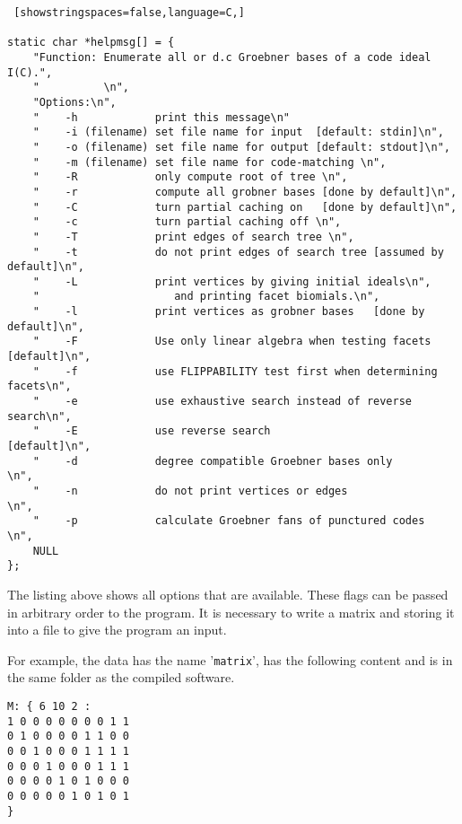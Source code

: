 \begin{lstlisting} [showstringspaces=false,language=C,]

static char *helpmsg[] = {
    "Function: Enumerate all or d.c Groebner bases of a code ideal I(C).",
    "          \n",
    "Options:\n",
    "    -h            print this message\n"
    "    -i (filename) set file name for input  [default: stdin]\n",
    "    -o (filename) set file name for output [default: stdout]\n",
    "    -m (filename) set file name for code-matching \n",
    "    -R            only compute root of tree \n",
    "    -r            compute all grobner bases [done by default]\n",
    "    -C            turn partial caching on   [done by default]\n",
    "    -c            turn partial caching off \n",
    "    -T            print edges of search tree \n",
    "    -t            do not print edges of search tree [assumed by default]\n",  
    "    -L            print vertices by giving initial ideals\n",
    "                     and printing facet biomials.\n",
    "    -l            print vertices as grobner bases   [done by default]\n",
    "    -F            Use only linear algebra when testing facets [default]\n",
    "    -f            use FLIPPABILITY test first when determining facets\n",
    "    -e            use exhaustive search instead of reverse search\n",
    "    -E            use reverse search                   [default]\n",
    "    -d            degree compatible Groebner bases only         \n",
    "    -n            do not print vertices or edges                \n",
    "    -p            calculate Groebner fans of punctured codes    \n",
    NULL
};

\end{lstlisting}

The listing above shows all options that are available. These flags can be passed in arbitrary order to the program. It is necessary to write a matrix and storing it into a file to give the program an input.

For example, the data has the name '\texttt{matrix}', has the following content and is in the same folder as the compiled software.
\begin{lstlisting}[basicstyle=\fontfamily{courier}\selectfont]
M: { 6 10 2 :
1 0 0 0 0 0 0 0 1 1 
0 1 0 0 0 0 1 1 0 0 
0 0 1 0 0 0 1 1 1 1 
0 0 0 1 0 0 0 1 1 1 
0 0 0 0 1 0 1 0 0 0 
0 0 0 0 0 1 0 1 0 1 
}
\end{lstlisting}

